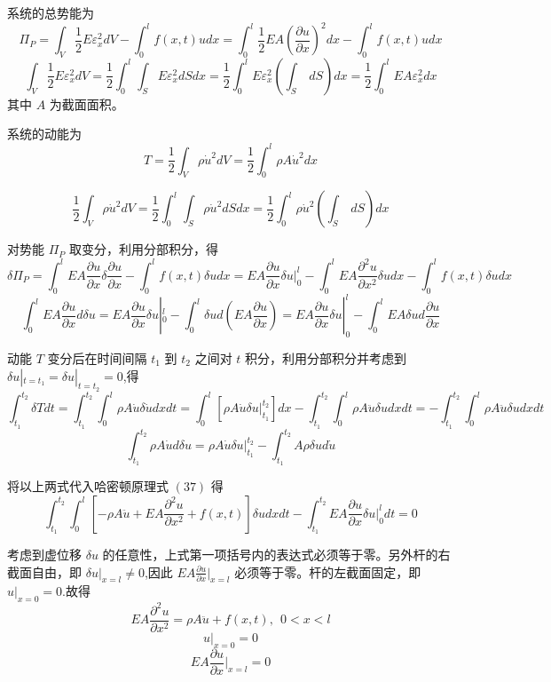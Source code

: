 \documentclass[12pt,a4paper]{article}
\begin{document}
系统的总势能为
\begin{equation}
\Pi _P=\int_{V}\frac{1}{2}E\varepsilon^2_xdV-\int_{0}^{l}f(x,t)udx=\int_{0}^{l}\frac{1}{2}EA(\frac{\partial u}{\partial x})^2dx-\int_{0}^{l}f(x,t)udx
\end{equation}
$$
\int_{V}\frac{1}{2}E\varepsilon^2_xdV=\frac{1}{2}\int_{0}^{l}\int_{S}E\varepsilon^2_xdSdx=\frac{1}{2}\int_{0}^{l}E\varepsilon^2_x\left(\int_{S}~dS\right)dx=\frac{1}{2}\int_{0}^{l}EA\varepsilon^2_xdx
$$
其中 $A$ 为截面面积。

系统的动能为
$$
T=\frac{1}{2}\int_{V}\rho\dot{u}^2dV=\frac{1}{2}\int_{0}^{l}\rho A\dot{u}^2dx
$$

$$
\frac{1}{2}\int_{V}\rho\dot{u}^2dV=\frac{1}{2}\int_{0}^{l}\int_{S}\rho\dot{u}^2dSdx=\frac{1}{2}\int_{0}^{l}\rho\dot{u}^2\left(\int_{S}~dS\right)dx
$$

对势能 $\Pi _P$ 取变分，利用分部积分，得
$$
\delta\Pi _P=\int_{0}^{l}EA\frac{\partial u}{\partial x}\delta\frac{\partial u}{\partial x}-\int_{0}^{l}f(x,t)\delta udx=EA\frac{\partial u}{\partial x}\delta u |^l_0-\int_{0}^{l}EA\frac{\partial^2 u}{\partial x^2}\delta udx-\int_{0}^{l}f(x,t)\delta udx
$$
$$
\int_{0}^{l}EA\frac{\partial u}{\partial x}d\delta u=EA\frac{\partial u}{\partial x}\delta u|^l_0-\int_{0}^{l}\delta ud\left(EA\frac{\partial u}{\partial x}\right)=EA\frac{\partial u}{\partial x}\delta u|^l_0-\int_{0}^{l}EA\delta ud\frac{\partial u}{\partial x}
$$

动能 $T$ 变分后在时间间隔 $t_1$ 到 $t_2$ 之间对 $t$ 积分，利用分部积分并考虑到 $\delta u|_{t=t_1}=\delta u|_{t=t_2}=0$,得
$$
\int_{t_1}^{t_2}\delta Tdt=\int_{t_1}^{t_2}\int_{0}^{l}\rho A\dot{u}\delta\dot{u}dxdt=\int_{0}^{l}\left[\rho A\dot{u}\delta u|^{t_2}_{t_1}\right]dx-\int_{t_1}^{t_2}\int_{0}^{l}\rho A\ddot{u}\delta udxdt=-\int_{t_1}^{t_2}\int_{0}^{l}\rho A\ddot{u}\delta udxdt
$$
$$
\int_{t_1}^{t_2}\rho A\dot{u}d\delta u=\rho A\dot{u}\delta u|_{t_1}^{t_2}-\int_{t_1}^{t_2}A\rho\delta ud\dot{u}
$$

将以上两式代入哈密顿原理式 $(37)$ 得
$$
\int_{t_1}^{t_2}\int_{0}^{l}\left[-\rho A\ddot{u}+EA\frac{\partial^2 u}{\partial x^2}+f(x,t)\right]\delta udxdt-\int_{t_1}^{t_2}EA\frac{\partial u}{\partial x}\delta u|_{0}^{l}dt=0
$$

考虑到虚位移 $\delta u$ 的任意性，上式第一项括号内的表达式必须等于零。另外杆的右截面自由，即 $\delta u|_{x=l}\ne 0$,因此 $EA\frac{\partial u}{\partial x}|_{x=l}$ 必须等于零。杆的左截面固定，即 $u|_{x=0}=0$.故得
$$
EA\frac{\partial^2 u}{\partial x^2}=\rho A\ddot{u}+f(x,t), ~~ 0<x<l
$$
$$
u|_{x=0}=0
$$
$$
EA\frac{\partial u}{\partial x}|_{x=l}=0
$$
\end{document}
